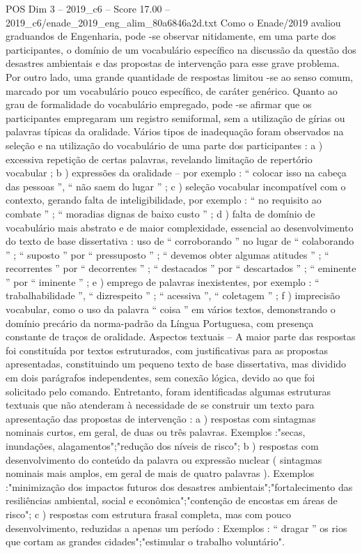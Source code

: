 \begin{textsample}{POS Dim 3 – 2019\_c6 – Score 17.00 – 2019\_c6/enade\_2019\_eng\_alim\_80a6846a2d.txt}
Como o Enade/2019 avaliou graduandos de Engenharia, pode -se observar nitidamente, em uma parte dos participantes, o domínio de um vocabulário específico na discussão da questão dos desastres ambientais e das propostas de intervenção para esse grave problema.
Por outro lado, uma grande quantidade de respostas limitou -se ao senso comum, marcado por um vocabulário pouco específico, de caráter genérico.
Quanto ao grau de formalidade do vocabulário empregado, pode -se afirmar que os participantes empregaram um registro semiformal, sem a utilização de gírias ou palavras típicas da oralidade.
Vários tipos de inadequação foram observados na seleção e na utilização do vocabulário de uma parte dos participantes : a ) excessiva repetição de certas palavras, revelando limitação de repertório vocabular ; b ) expressões da oralidade – por exemplo : “ colocar isso na cabeça das pessoas ”, “ não saem do lugar ” ; c ) seleção vocabular incompatível com o contexto, gerando falta de inteligibilidade, por exemplo : “ no requisito ao combate ” ; “ moradias dignas de baixo custo ” ; d ) falta de domínio de vocabulário mais abstrato e de maior complexidade, essencial ao desenvolvimento do texto de base dissertativa : uso de “ corroborando ” no lugar de “ colaborando ” ; “ suposto ” por “ pressuposto ” ; “ devemos obter algumas atitudes ” ; “ recorrentes ” por “ decorrentes ” ; “ destacados ” por “ descartados ” ; “ eminente ” por “ iminente ” ; e ) emprego de palavras inexistentes, por exemplo : “ trabalhabilidade ”, “ dizrespeito ” ; “ acessiva ”, “ coletagem ” ; f ) imprecisão vocabular, como o uso da palavra “ coisa ” em vários textos, demonstrando o domínio precário da norma-padrão da Língua Portuguesa, com presença constante de traços de oralidade.
Aspectos textuais – A maior parte das respostas foi constituída por textos estruturados, com justificativas para as propostas apresentadas, constituindo um pequeno texto de base dissertativa, mas dividido em dois parágrafos independentes, sem conexão lógica, devido ao que foi solicitado pelo comando.
Entretanto, foram identificadas algumas estruturas textuais que não atenderam à necessidade de se construir um texto para apresentação das propostas de intervenção : a ) respostas com sintagmas nominais curtos, em geral, de duas ou três palavras.
Exemplos :"secas, inundações, alagamentos";"redução dos níveis de risco"; b ) respostas com desenvolvimento do conteúdo da palavra ou expressão nuclear ( sintagmas nominais mais amplos, em geral de mais de quatro palavras ).
Exemplos :"minimização dos impactos futuros dos desastres ambientais";"fortalecimento das resiliências ambiental, social e econômica";"contenção de encostas em áreas de risco"; c ) respostas com estrutura frasal completa, mas com pouco desenvolvimento, reduzidas a apenas um período : Exemplos : “ dragar ” os rios que cortam as grandes cidades";"estimular o trabalho voluntário".

\end{textsample}

